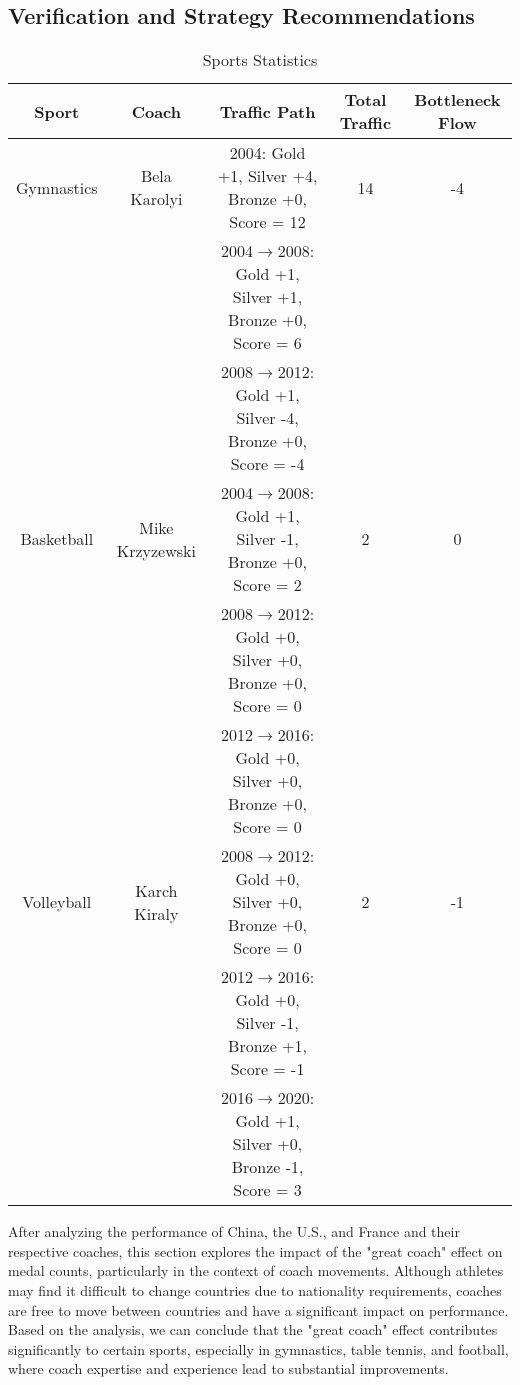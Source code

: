 \documentclass{mcmthesis}
\begin{document}
        
\subsection{Verification and Strategy Recommendations}
     \begin{table}[ht]
\centering
\begin{tabular}{|c|c|c|c|c|}
\hline
Sport & Coach & Traffic Path & Total Traffic & Bottleneck Flow \\
\hline
Gymnastics & Bela Karolyi & 2004: Gold +1, Silver +4, Bronze +0, Score = 12 & 14 & -4 \\
 & & 2004$\to$2008: Gold +1, Silver +1, Bronze +0, Score = 6 & & \\
 & & 2008$\to$2012: Gold +1, Silver -4, Bronze +0, Score = -4 & & \\
\hline
Basketball & Mike Krzyzewski & 2004$\to$2008: Gold +1, Silver -1, Bronze +0, Score = 2 & 2 & 0 \\
 & & 2008$\to$2012: Gold +0, Silver +0, Bronze +0, Score = 0 & & \\
 & & 2012$\to$2016: Gold +0, Silver +0, Bronze +0, Score = 0 & & \\
\hline
Volleyball & Karch Kiraly & 2008$\to$2012: Gold +0, Silver +0, Bronze +0, Score = 0 & 2 & -1 \\
 & & 2012$\to$2016: Gold +0, Silver -1, Bronze +1, Score = -1 & & \\
 & & 2016$\to$2020: Gold +1, Silver +0, Bronze -1, Score = 3 & & \\
\hline
\end{tabular}
\caption{Sports Statistics}
\end{table}   

    After analyzing the performance of China, the U.S., and France and their respective coaches, this section explores the impact of the "great coach" effect on medal counts, particularly in the context of coach movements. Although athletes may find it difficult to change countries due to nationality requirements, coaches are free to move between countries and have a significant impact on performance. Based on the analysis, we can conclude that the "great coach" effect contributes significantly to certain sports, especially in gymnastics, table tennis, and football, where coach expertise and experience lead to substantial improvements.
\end{document}
